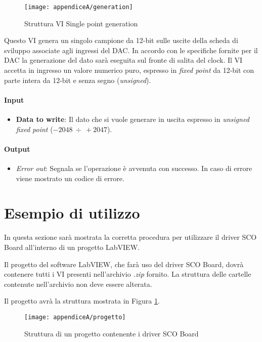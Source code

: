 \begin{figure}[H]  
	\begin{center}
		\texttt{[image: appendiceA/generation]}
		\caption{Struttura VI Single point generation}
	\end{center}
\end{figure}

Questo VI genera un singolo campione da 12-bit sulle uscite della scheda di sviluppo associate agli ingressi del DAC. 
In accordo con le specifiche fornite per il DAC la generazione del dato sarà eseguita sul fronte di salita del clock.
Il VI accetta in ingresso un valore numerico puro, espresso in \textit{fixed point} da 12-bit con parte intera da 12-bit e senza segno (\textit{unsigned}).
\paragraph*{Input}
\begin{itemize}
	\item \textbf{Data to write}: Il dato che si vuole generare in uscita espresso in \textit{unsigned fixed point} ($-2048 \ \div \ +2047$).
\end{itemize}

\paragraph*{Output}
\begin{itemize}
	\item \textit{Error out}: Segnala se l'operazione è avvenuta con successo. In caso di errore viene mostrato un codice di errore.
\end{itemize}

\section*{Esempio di utilizzo}
In questa sezione sarà mostrata la corretta procedura per utilizzare il driver SCO Board all'interno di un progetto LabVIEW.

Il progetto del software LabVIEW, che farà uso del driver SCO Board, dovrà contenere tutti i VI presenti nell'archivio \textit{.zip} fornito. La struttura delle cartelle contenute nell'archivio non deve essere alterata.

Il progetto avrà la struttura mostrata in Figura \ref{progetto}.

\begin{figure}[H]
	\begin{center}
		\texttt{[image: appendiceA/progetto]}
		\caption{Struttura di un progetto contenente i driver SCO Board}
		\label{progetto}
	\end{center}
\end{figure}

